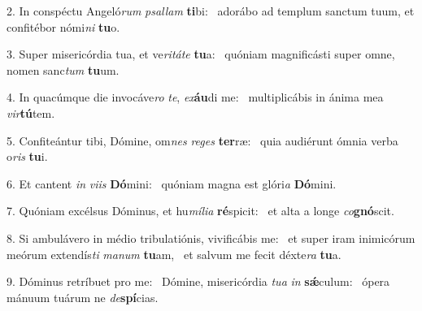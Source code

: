 2. In conspéctu Angeló\textit{rum} \textit{psal}\textit{lam} \textbf{ti}bi: \ast\  adorábo ad templum sanctum tuum, et confitébor nómi\textit{ni} \textbf{tu}o.\

3. Super misericórdia tua, et ve\textit{ri}\textit{tá}\textit{te} \textbf{tu}a: \ast\  quóniam magnificásti super omne, nomen sanc\textit{tum} \textbf{tu}um.\

4. In quacúmque die invocáve\textit{ro} \textit{te}, \textit{ex}\textbf{áu}di me: \ast\  multiplicábis in ánima mea \textit{vir}\textbf{tú}tem.\

5. Confiteántur tibi, Dómine, om\textit{nes} \textit{re}\textit{ges} \textbf{ter}ræ: \ast\  quia audiérunt ómnia verba o\textit{ris} \textbf{tu}i.\

6. Et cantent \textit{in} \textit{vi}\textit{is} \textbf{Dó}mini: \ast\  quóniam magna est glóri\textit{a} \textbf{Dó}mini.\

7. Quóniam excélsus Dóminus, et hu\textit{mí}\textit{li}\textit{a} \textbf{ré}spicit: \ast\  et alta a longe \textit{co}\textbf{gnó}scit.\

8. Si ambulávero in médio tribulatiónis, vivificábis me: \dag\  et super iram inimicórum meórum extendís\textit{ti} \textit{ma}\textit{num} \textbf{tu}am, \ast\  et salvum me fecit déxte\textit{ra} \textbf{tu}a.\

9. Dóminus retríbuet pro me: \dag\  Dómine, misericórdia \textit{tu}\textit{a} \textit{in} \textbf{sǽ}culum: \ast\  ópera mánuum tuárum ne \textit{de}\textbf{spí}cias.\


